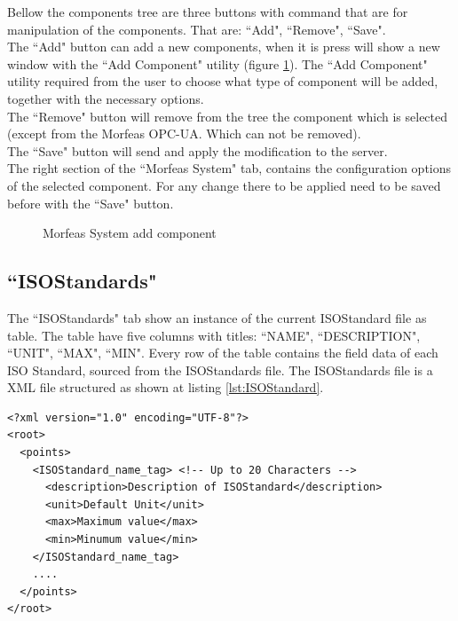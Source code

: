 Bellow the components tree are three buttons with command that are for manipulation of the components.
That are: ``Add", ``Remove", ``Save".\\

\noindent The ``Add" button can add a new components, when it is press will show a new window with the ``Add Component" utility
(figure \ref{fig:Morfeas_sys_conf_add_comp}).
The ``Add Component" utility required from the user to choose what type of component will be added, together with the necessary options.\\

\noindent The ``Remove" button will remove from the tree the component which is selected (except from the Morfeas OPC-UA. Which can not be removed).\\

\noindent The ``Save" button will send and apply the modification to the server.\\

The right section of the ``Morfeas System" tab, contains the configuration options of the selected component.
For any change there to be applied need to be saved before with the ``Save" button.

\begin{figure}[h]
\centering
	\caption{Morfeas System add component}
	\label{fig:Morfeas_sys_conf_add_comp}
\end{figure}

\newpage
\subsection{``ISOStandards"}
The ``ISOStandards" tab show an instance of the current ISOStandard file as table.
The table have five columns with titles: ``NAME", ``DESCRIPTION", ``UNIT", ``MAX", ``MIN".
Every row of the table contains the field data of each ISO Standard, sourced from the ISOStandards file. 
The ISOStandards file is a XML file structured as shown at listing \ref{lst:ISOStandard}.

\begin{lstlisting}[frame=single,caption=Structure of ISOstandard file,label=lst:ISOStandard]
<?xml version="1.0" encoding="UTF-8"?>
<root>
  <points>
    <ISOStandard_name_tag> <!-- Up to 20 Characters -->
      <description>Description of ISOStandard</description>
      <unit>Default Unit</unit>
      <max>Maximum value</max>
      <min>Minumum value</min>
    </ISOStandard_name_tag>
    ....
  </points>
</root>
\end{lstlisting}

